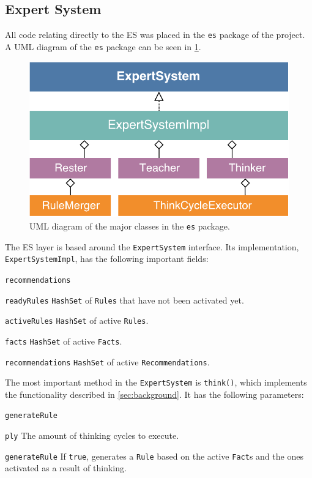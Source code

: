 \documentclass[titlepage,11pt]{article}
\newcommand{\code}[1]{\texttt{#1}}
\begin{document}
\subsection{Expert System}

All code relating directly to the ES was placed in the \code{es} package of the project. A UML diagram of the \code{es} package can be seen in \cref{fig:uml_es}.

\begin{figure}[!htb]
	\includegraphics[width=\columnwidth]{figures/uml_es.pdf}
	\caption{UML diagram of the major classes in the \code{es} package.}
	\label{fig:uml_es}
\end{figure}

The ES layer is based around the \code{ExpertSystem} interface. Its implementation, \code{ExpertSystemImpl}, has the following important fields:

\begin{labeling}{\code{recommendations}}
	\item[\code{readyRules}] \code{HashSet} of \code{Rules} that have not been activated yet.
	\item[\code{activeRules}] \code{HashSet} of active \code{Rules}.
	\item[\code{facts}] \code{HashSet} of active \code{Facts}.
	\item[\code{recommendations}] \code{HashSet} of active \code{Recommendations}.
\end{labeling}

The most important method in the \code{ExpertSystem} is \code{think()}, which implements the functionality described in \cref{sec:background}. It has the following parameters:

\begin{labeling}{\code{generateRule}}
	\item[\code{ply}] The amount of thinking cycles to execute.
	\item[\code{generateRule}] If \code{true}, generates a \code{Rule} based on the active \code{Fact}s and the ones activated as a result of thinking.
\end{labeling}
\end{document}
